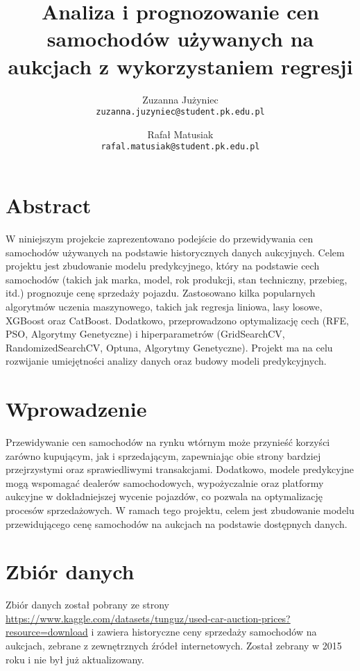 \documentclass[10pt,letterpaper]{article}
\begin{document}
\title{Analiza i prognozowanie cen samochodów używanych na aukcjach z wykorzystaniem regresji}

\author{Zuzanna Jużyniec\\
{\tt\small zuzanna.juzyniec@student.pk.edu.pl}
\and
Rafał Matusiak\\
{\tt\small rafal.matusiak@student.pk.edu.pl}
}
\maketitle

\tableofcontents 

\newpage
\section{Abstract}
W niniejszym projekcie zaprezentowano podejście do przewidywania cen samochodów używanych na podstawie historycznych danych aukcyjnych. Celem projektu jest zbudowanie modelu predykcyjnego, który na podstawie cech samochodów (takich jak marka, model, rok produkcji, stan techniczny, przebieg, itd.) prognozuje cenę sprzedaży pojazdu. Zastosowano kilka popularnych algorytmów uczenia maszynowego, takich jak regresja liniowa, lasy losowe, XGBoost oraz CatBoost. Dodatkowo, przeprowadzono optymalizację cech (RFE, PSO, Algorytmy Genetyczne) i hiperparametrów (GridSearchCV, RandomizedSearchCV, Optuna, Algorytmy Genetyczne). Projekt ma na celu rozwijanie umiejętności analizy danych oraz budowy modeli predykcyjnych.

\section{Wprowadzenie}
Przewidywanie cen samochodów na rynku wtórnym może przynieść korzyści zarówno kupującym, jak i sprzedającym, zapewniając obie strony bardziej przejrzystymi oraz sprawiedliwymi transakcjami. Dodatkowo, modele predykcyjne mogą wspomagać dealerów samochodowych, wypożyczalnie oraz platformy aukcyjne w dokładniejszej wycenie pojazdów, co pozwala na optymalizację procesów sprzedażowych. W ramach tego projektu, celem jest zbudowanie modelu przewidującego cenę samochodów na aukcjach na podstawie dostępnych danych.

\newpage
\section{Zbiór danych}
Zbiór danych został pobrany ze strony \url{https://www.kaggle.com/datasets/tunguz/used-car-auction-prices?resource=download} i zawiera historyczne ceny sprzedaży samochodów na aukcjach, zebrane z zewnętrznych źródeł internetowych. Został zebrany w 2015 roku i nie był już aktualizowany.
\end{document}
